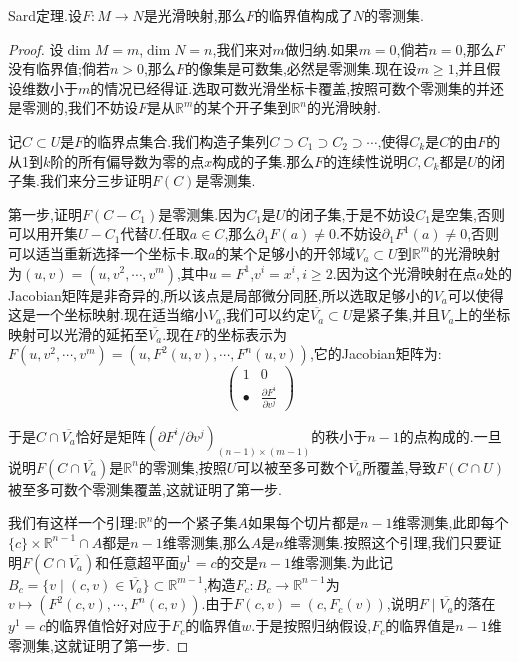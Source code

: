 Sard定理.设$F:M\to N$是光滑映射,那么$F$的临界值构成了$N$的零测集.
\begin{proof}
	
	设$\dim M=m$,$\dim N=n$,我们来对$m$做归纳.如果$m=0$,倘若$n=0$,那么$F$没有临界值;倘若$n>0$,那么$F$的像集是可数集,必然是零测集.现在设$m\ge1$,并且假设维数小于$m$的情况已经得证.选取可数光滑坐标卡覆盖,按照可数个零测集的并还是零测的,我们不妨设$F$是从$\mathbb{R}^m$的某个开子集到$\mathbb{R}^n$的光滑映射.
	
	\qquad
	
	记$C\subset U$是$F$的临界点集合.我们构造子集列$C\supset C_1\supset C_2\supset\cdots$,使得$C_k$是$C$的由$F$的从1到$k$阶的所有偏导数为零的点$x$构成的子集.那么$F$的连续性说明$C,C_k$都是$U$的闭子集.我们来分三步证明$F(C)$是零测集.
	
	\qquad
	
	第一步,证明$F(C-C_1)$是零测集.因为$C_1$是$U$的闭子集,于是不妨设$C_1$是空集,否则可以用开集$U-C_1$代替$U$.任取$a\in C$,那么$\partial_1F(a)\not=0$.不妨设$\partial_1F^1(a)\not=0$,否则可以适当重新选择一个坐标卡.取$a$的某个足够小的开邻域$V_a\subset U$到$\mathbb{R}^m$的光滑映射为$(u,v)=(u,v^2,\cdots,v^m)$,其中$u=F^1$,$v^i=x^i,i\ge2$.因为这个光滑映射在点$a$处的Jacobian矩阵是非奇异的,所以该点是局部微分同胚,所以选取足够小的$V_a$可以使得这是一个坐标映射.现在适当缩小$V_a$,我们可以约定$\overline{V_a}\subset U$是紧子集,并且$V_a$上的坐标映射可以光滑的延拓至$\overline{V_a}$.现在$F$的坐标表示为$F(u,v^2,\cdots,v^m)=(u,F^2(u,v),\cdots,F^n(u,v))$,它的Jacobian矩阵为:
	$$\left(\begin{array}{cc}1&0\\\bullet&\frac{\partial F^i}{\partial v^j}\end{array}\right)$$
	
	于是$C\cap\overline{V_a}$恰好是矩阵$(\partial F^i/\partial v^j)_{(n-1)\times(m-1)}$的秩小于$n-1$的点构成的.一旦说明$F(C\cap\overline{V_a})$是$\mathbb{R}^n$的零测集,按照$U$可以被至多可数个$\overline{V_a}$所覆盖,导致$F(C\cap U)$被至多可数个零测集覆盖,这就证明了第一步.
	
	\qquad
	
	我们有这样一个引理:$\mathbb{R}^n$的一个紧子集$A$如果每个切片都是$n-1$维零测集,此即每个$\{c\}\times\mathbb{R}^{n-1}\cap A$都是$n-1$维零测集,那么$A$是$n$维零测集.按照这个引理,我们只要证明$F(C\cap\overline{V_a})$和任意超平面$y^1=c$的交是$n-1$维零测集.为此记$B_c=\{v\mid(c,v)\in\overline{V_a}\}\subset\mathbb{R}^{m-1}$,构造$F_c:B_c\to\mathbb{R}^{n-1}$为$v\mapsto(F^2(c,v),\cdots,F^n(c,v))$.由于$F(c,v)=(c,F_c(v))$,说明$F\mid\overline{V_a}$的落在$y^1=c$的临界值恰好对应于$F_c$的临界值$w$.于是按照归纳假设,$F_c$的临界值是$n-1$维零测集,这就证明了第一步.
	

\end{proof}
